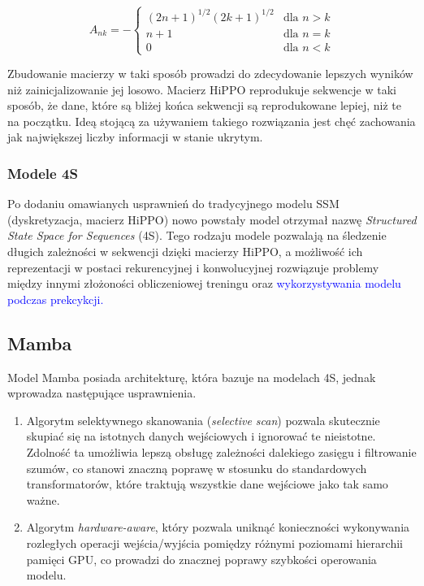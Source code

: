 \documentclass[data-science]{agh-wi} %
\begin{document}
\begin{equation}
    A_{nk} = -
    \begin{cases}
        (2n + 1)^{1/2} (2k + 1)^{1/2} & \text{dla } n > k \\
        n + 1                         & \text{dla } n = k \\
        0                             & \text{dla } n < k
    \end{cases}
    \label{equ:hippo_matrix}
\end{equation}

Zbudowanie macierzy w taki sposób prowadzi do zdecydowanie lepszych wyników niż zainicjalizowanie jej losowo. Macierz HiPPO reprodukuje sekwencje w taki sposób, że dane, które są bliżej końca sekwencji są reprodukowane lepiej, niż te na początku. Ideą stojącą za używaniem takiego rozwiązania jest chęć zachowania jak największej liczby informacji w stanie ukrytym.

\subsubsection*{Modele 4S}
Po dodaniu omawianych usprawnień do tradycyjnego modelu SSM (dyskretyzacja, macierz HiPPO) nowo powstały model otrzymał nazwę \textit{Structured State Space for Sequences} (4S). Tego rodzaju modele pozwalają na śledzenie długich zależności w sekwencji dzięki macierzy HiPPO, a możliwość ich reprezentacji w postaci rekurencyjnej i konwolucyjnej rozwiązuje problemy między innymi złożoności obliczeniowej treningu oraz \textcolor{blue}{wykorzystywania modelu podczas prekcykcji.}

\subsection{Mamba}
Model Mamba posiada architekturę, która bazuje na modelach 4S, jednak wprowadza następujące usprawnienia.
\begin{enumerate}
    \item Algorytm selektywnego skanowania (\textit{selective scan}) pozwala skutecznie skupiać się na istotnych danych wejściowych i ignorować te nieistotne. Zdolność ta umożliwia lepszą obsługę zależności dalekiego zasięgu i filtrowanie szumów, co stanowi znaczną poprawę w stosunku do standardowych transformatorów, które traktują wszystkie dane wejściowe jako tak samo ważne.
    \item Algorytm \textit{hardware-aware}, który pozwala uniknąć konieczności wykonywania rozległych operacji wejścia/wyjścia pomiędzy różnymi poziomami hierarchii pamięci GPU, co prowadzi do znacznej poprawy szybkości operowania modelu.
\end{enumerate}
\end{document}

